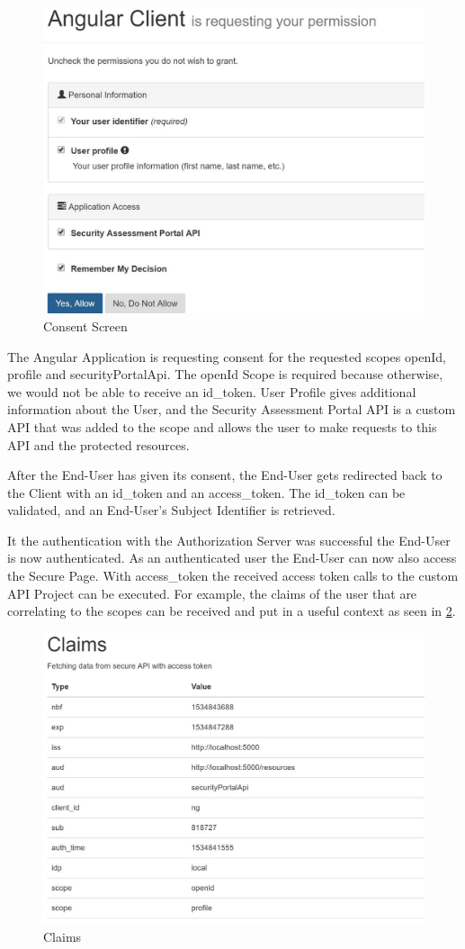 \begin{figure}[h]
	\centering
	\includegraphics[width=0.8\linewidth]{images/consent_screen}
	\caption{Consent Screen}
	\label{fig:consentscreen}
\end{figure}


The Angular Application is requesting consent for the requested scopes openId, profile and securityPortalApi. The openId Scope is required because otherwise, we would not be able to receive an id\_token. User Profile gives additional information about the User, and the  Security Assessment Portal API is a custom API that was added to the scope and allows the user to make requests to this API and the protected resources. 


After the End-User has given its consent, the End-User gets redirected back to the Client with an id\_token and an access\_token. The id\_token can be validated, and an End-User’s Subject Identifier is retrieved.

It the authentication with the Authorization Server was successful the End-User is now authenticated. As an authenticated user the End-User can now also access the Secure Page. With access\_token the received access token calls to the custom API Project can be executed. For example, the claims of the user that are correlating to the scopes can be received and put in a useful context as seen in \ref{fig:claims}.


\begin{figure}
	\centering
	\includegraphics[width=0.8\linewidth]{images/claims}
	\caption{Claims}
	\label{fig:claims}
\end{figure}



\chapterend
